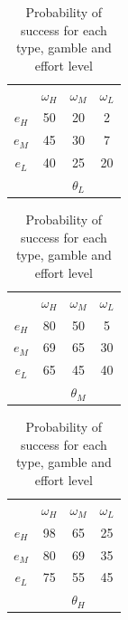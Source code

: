 \documentclass[
  12pt,
]{article}
\begin{document}
\begin{table}[htbp]

\begin{tabular}{ c|c|c|c|}
  
  \multicolumn{1}{c}{} & \multicolumn{1}{c}{$\omega_H$} & \multicolumn{1}{c}{$\omega_M$} & \multicolumn{1}{c}{$\omega_L$}\\
  \cline{2-4}
  $e_H$ & 50 & 20 & 2 \\
  \cline{2-4}
  $e_M$ & 45 & 30 & 7 \\
  \cline{2-4}
  $e_L$ & 40 & 25 & 20 \\

  \cline{2-4}
  \multicolumn{1}{c}{} & \multicolumn{1}{c}{} & \multicolumn{1}{c}{$\theta_L$} & \multicolumn{1}{c}{}\\
\end{tabular}
\hspace{.3cm} 
\begin{tabular}{ c|c|c|c|}
  
  \multicolumn{1}{c}{} & \multicolumn{1}{c}{$\omega_H$} & \multicolumn{1}{c}{$\omega_M$} & \multicolumn{1}{c}{$\omega_L$}\\
  \cline{2-4}
  $e_H$ & 80 & 50 & 5 \\
  \cline{2-4}
  $e_M$ & 69 & 65 & 30 \\
  \cline{2-4}
  $e_L$ & 65 & 45 & 40 \\
  \cline{2-4}
  \multicolumn{1}{c}{} & \multicolumn{1}{c}{} & \multicolumn{1}{c}{$\theta_M$} & \multicolumn{1}{c}{}\\
\end{tabular}
\hspace{.3cm} 
\begin{tabular}{ c|c|c|c|}
  
  \multicolumn{1}{c}{} & \multicolumn{1}{c}{$\omega_H$} & \multicolumn{1}{c}{$\omega_M$} & \multicolumn{1}{c}{$\omega_L$}\\
  \cline{2-4}
  $e_H$ & 98 & 65 & 25 \\
  \cline{2-4}
  $e_M$ & 80 & 69 & 35 \\
  \cline{2-4}
  $e_L$ & 75 & 55 & 45 \\
  \cline{2-4}
  \multicolumn{1}{c}{} & \multicolumn{1}{c}{} & \multicolumn{1}{c}{$\theta_H$} & \multicolumn{1}{c}{}\\
\end{tabular}

\caption{Probability of success for each type, gamble and effort level}
\label{tab:table1}
\end{table}
\end{document}
